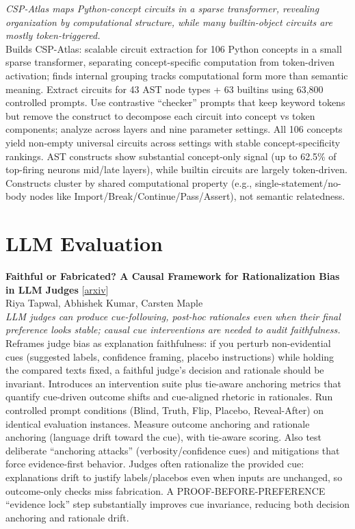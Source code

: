 \documentclass[12pt,letterpaper]{article}
\begin{document}
{\small\textit{CSP-Atlas maps Python-concept circuits in a sparse transformer, revealing organization by computational structure, while many builtin-object circuits are mostly token-triggered.}}\\[1pt]
{\footnotesize Builds CSP-Atlas: scalable circuit extraction for 106 Python concepts in a small sparse transformer, separating concept-specific computation from token-driven activation; finds internal grouping tracks computational form more than semantic meaning. Extract circuits for 43 AST node types + 63 builtins using 63,800 controlled prompts. Use contrastive ``checker'' prompts that keep keyword tokens but remove the construct to decompose each circuit into concept vs token components; analyze across layers and nine parameter settings. All 106 concepts yield non-empty universal circuits across settings with stable concept-specificity rankings. AST constructs show substantial concept-only signal (up to 62.5\% of top-firing neurons mid/late layers), while builtin circuits are largely token-driven. Constructs cluster by shared computational property (e.g., single-statement/no-body nodes like Import/Break/Continue/Pass/Assert), not semantic relatedness.}

\medskip


\section*{LLM Evaluation}

{\small\textbf{Faithful or Fabricated? A Causal Framework for Rationalization Bias in LLM Judges}} {\scriptsize[\href{https://arxiv.org/abs/2605.23970}{arxiv}]}\\
{\scriptsize Riya Tapwal, Abhishek Kumar, Carsten Maple}\\

{\small\textit{LLM judges can produce cue-following, post-hoc rationales even when their final preference looks stable; causal cue interventions are needed to audit faithfulness.}}\\[1pt]
{\footnotesize Reframes judge bias as explanation faithfulness: if you perturb non-evidential cues (suggested labels, confidence framing, placebo instructions) while holding the compared texts fixed, a faithful judge's decision and rationale should be invariant. Introduces an intervention suite plus tie-aware anchoring metrics that quantify cue-driven outcome shifts and cue-aligned rhetoric in rationales. Run controlled prompt conditions (Blind, Truth, Flip, Placebo, Reveal-After) on identical evaluation instances. Measure outcome anchoring and rationale anchoring (language drift toward the cue), with tie-aware scoring. Also test deliberate ``anchoring attacks'' (verbosity/confidence cues) and mitigations that force evidence-first behavior. Judges often rationalize the provided cue: explanations drift to justify labels/placebos even when inputs are unchanged, so outcome-only checks miss fabrication. A PROOF-BEFORE-PREFERENCE ``evidence lock'' step substantially improves cue invariance, reducing both decision anchoring and rationale drift.}
\end{document}
